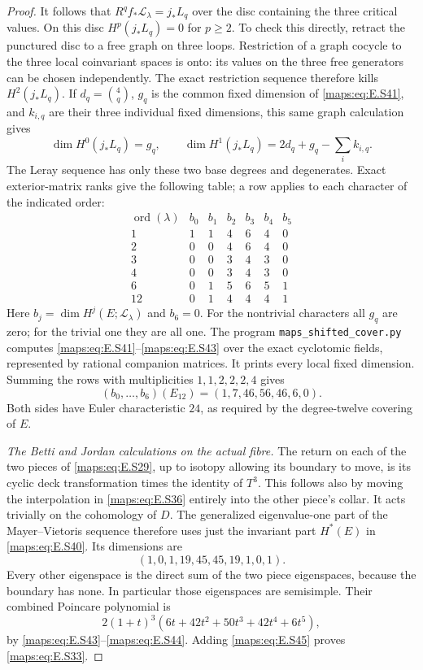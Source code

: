 \begin{proof}
It follows that $R^q f_*\mathcal L_\lambda=j_*L_q$ over
the disc containing the three critical values. On this
disc $H^p(j_*L_q)=0$ for $p\geq2$. To check this directly,
retract the punctured disc to a free graph on three loops.
Restriction of a graph cocycle to the three local
coinvariant spaces is onto: its values on the three free
generators can be chosen independently. The exact
restriction sequence therefore kills $H^2(j_*L_q)$.
If $d_q=\binom4q$, $g_q$ is the common fixed dimension of
\eqref{maps:eq:E.S41}, and $k_{i,q}$ are their three individual fixed
dimensions, this same graph calculation gives
\[
 \dim H^0(j_*L_q)=g_q,\qquad
 \dim H^1(j_*L_q)=2d_q+g_q-\sum_i k_{i,q}.
 \tag{E.S42}\label{maps:eq:E.S42}
\]
The Leray sequence has only these two base degrees and
degenerates. Exact exterior-matrix ranks give the following
table; a row applies to each character of the indicated
order:
\[
 \begin{array}{c|rrrrrr}
 \operatorname{ord}(\lambda)&b_0&b_1&b_2&b_3&b_4&b_5\\ \hline
 1 &1&1&4&6&4&0\\
 2 &0&0&4&6&4&0\\
 3 &0&0&3&4&3&0\\
 4 &0&0&3&4&3&0\\
 6 &0&1&5&6&5&1\\
 12&0&1&4&4&4&1
 \end{array}
 \tag{E.S43}\label{maps:eq:E.S43}
\]
Here $b_j=\dim H^j(E;\mathcal L_\lambda)$ and $b_6=0$.
For the nontrivial characters all $g_q$ are zero; for the
trivial one they are all one. The program
\texttt{maps\_shifted\_cover.py} computes \eqref{maps:eq:E.S41}--\eqref{maps:eq:E.S43}
over the exact cyclotomic fields, represented by rational
companion matrices. It prints every local fixed dimension.
Summing the rows with multiplicities $1,1,2,2,2,4$ gives
\[
             (b_0,\ldots,b_6)(E_{12})=(1,7,46,56,46,6,0).
 \tag{E.S44}\label{maps:eq:E.S44}
\]
Both sides have Euler characteristic $24$, as required by
the degree-twelve covering of $E$.

\emph{The Betti and Jordan calculations on the actual fibre.}
The return on each of the two pieces of \eqref{maps:eq:E.S29}, up to
isotopy allowing its boundary to move, is its cyclic deck
transformation times the identity of $T^3$. This follows
also by moving the interpolation in \eqref{maps:eq:E.S36} entirely into
the other piece's collar. It acts trivially on the
cohomology of $D$. The generalized eigenvalue-one part of
the Mayer--Vietoris sequence therefore uses just the
invariant part $H^*(E)$ in \eqref{maps:eq:E.S40}. Its dimensions are
\[
       (1,0,1,19,45,45,19,1,0,1).
 \tag{E.S45}\label{maps:eq:E.S45}
\]
Every other eigenspace is the direct sum of the two piece
eigenspaces, because the boundary has none. In particular
those eigenspaces are semisimple. Their combined Poincare
polynomial is
\[
     2(1+t)^3(6t+42t^2+50t^3+42t^4+6t^5),
 \tag{E.S46}\label{maps:eq:E.S46}
\]
by \eqref{maps:eq:E.S43}--\eqref{maps:eq:E.S44}. Adding \eqref{maps:eq:E.S45} proves \eqref{maps:eq:E.S33}.


\end{proof}
